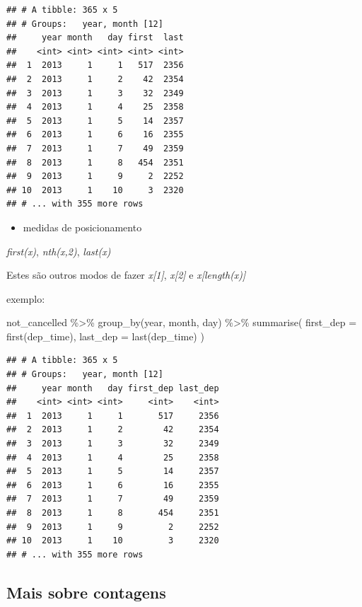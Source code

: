 \documentclass[
]{article}
\newenvironment{Shaded}{\begin{snugshade}}{\end{snugshade}}
\newcommand{\AttributeTok}[1]{\textcolor[rgb]{0.77,0.63,0.00}{#1}}
\newcommand{\FunctionTok}[1]{\textcolor[rgb]{0.00,0.00,0.00}{#1}}
\newcommand{\NormalTok}[1]{#1}
\newcommand{\SpecialCharTok}[1]{\textcolor[rgb]{0.00,0.00,0.00}{#1}}
\providecommand{\tightlist}{%
  \setlength{\itemsep}{0pt}\setlength{\parskip}{0pt}}
\begin{document}
\begin{verbatim}
## # A tibble: 365 x 5
## # Groups:   year, month [12]
##     year month   day first  last
##    <int> <int> <int> <int> <int>
##  1  2013     1     1   517  2356
##  2  2013     1     2    42  2354
##  3  2013     1     3    32  2349
##  4  2013     1     4    25  2358
##  5  2013     1     5    14  2357
##  6  2013     1     6    16  2355
##  7  2013     1     7    49  2359
##  8  2013     1     8   454  2351
##  9  2013     1     9     2  2252
## 10  2013     1    10     3  2320
## # ... with 355 more rows
\end{verbatim}

\begin{itemize}
\tightlist
\item
  medidas de posicionamento
\end{itemize}

\emph{first(x)}, \emph{nth(x,2)}, \emph{last(x)}

Estes são outros modos de fazer \emph{x{[}1{]}}, \emph{x{[}2{]}} e
\emph{x{[}length(x){]}}

exemplo:

\begin{Shaded}
\begin{Highlighting}[]
\NormalTok{not\_cancelled }\SpecialCharTok{\%\textgreater{}\%} 
  \FunctionTok{group\_by}\NormalTok{(year, month, day) }\SpecialCharTok{\%\textgreater{}\%} 
  \FunctionTok{summarise}\NormalTok{(}
    \AttributeTok{first\_dep =} \FunctionTok{first}\NormalTok{(dep\_time), }
    \AttributeTok{last\_dep =} \FunctionTok{last}\NormalTok{(dep\_time)}
\NormalTok{  )}
\end{Highlighting}
\end{Shaded}

\begin{verbatim}
## # A tibble: 365 x 5
## # Groups:   year, month [12]
##     year month   day first_dep last_dep
##    <int> <int> <int>     <int>    <int>
##  1  2013     1     1       517     2356
##  2  2013     1     2        42     2354
##  3  2013     1     3        32     2349
##  4  2013     1     4        25     2358
##  5  2013     1     5        14     2357
##  6  2013     1     6        16     2355
##  7  2013     1     7        49     2359
##  8  2013     1     8       454     2351
##  9  2013     1     9         2     2252
## 10  2013     1    10         3     2320
## # ... with 355 more rows
\end{verbatim}

\hypertarget{mais-sobre-contagens}{%
\subsection{Mais sobre contagens}\label{mais-sobre-contagens}}
\end{document}
